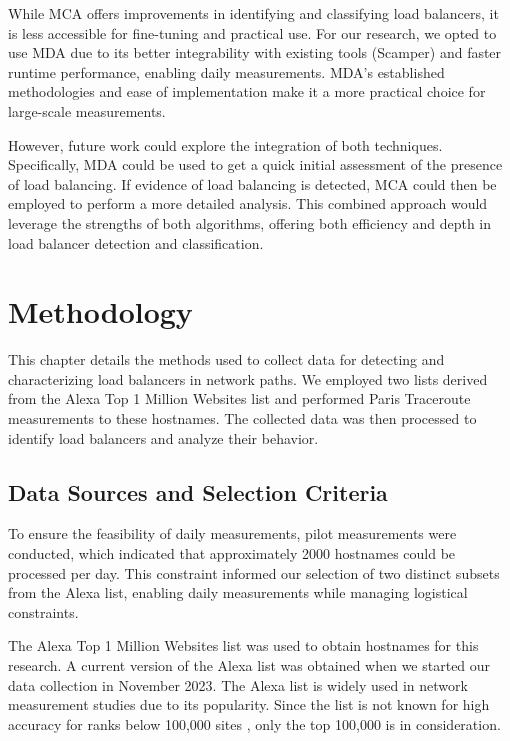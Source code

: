 \documentclass[12pt]{cwru_thesis}
\begin{document}
While MCA offers improvements in identifying and classifying load balancers, it is less accessible for fine-tuning and practical use. For our research, we opted to use MDA due to its better integrability with existing tools (Scamper) and faster runtime performance, enabling daily measurements. MDA's established methodologies and ease of implementation make it a more practical choice for large-scale measurements. 

However, future work could explore the integration of both techniques. Specifically, MDA could be used to get a quick initial assessment of the presence of load balancing. If evidence of load balancing is detected, MCA could then be employed to perform a more detailed analysis. This combined approach would leverage the strengths of both algorithms, offering both efficiency and depth in load balancer detection and classification.

 

\chapter{Methodology}

This chapter details the methods used to collect data for detecting and characterizing load balancers in network paths. We employed two lists derived from the Alexa Top 1 Million Websites list \cite{alexa2023top1m} and performed Paris Traceroute measurements to these hostnames. The collected data was then processed to identify load balancers and analyze their behavior.

\section{Data Sources and Selection Criteria}

To ensure the feasibility of daily measurements, pilot measurements were conducted, which indicated that approximately 2000 hostnames could be processed per day. This constraint informed our selection of two distinct subsets from the Alexa list, enabling daily measurements while managing logistical constraints.

The Alexa Top 1 Million Websites list was used to obtain hostnames for this research. A current version of the Alexa list was obtained when we started our data collection in November 2023. The Alexa list is widely used in network measurement studies due to its popularity. Since the list is not known for high accuracy for ranks below 100,000 sites  \cite{alexa2023top1m}, only the top 100,000 is in consideration.
\end{document}
